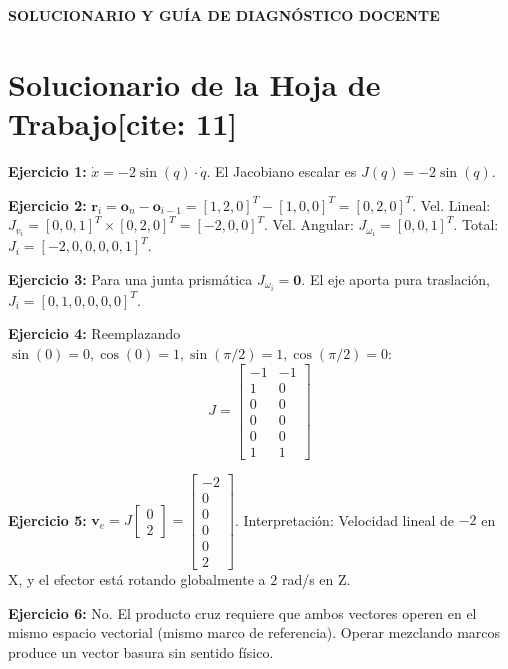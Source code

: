 \documentclass[11pt, a4paper]{article}
\begin{document}
\begin{center}
    \Large\textbf{\textcolor{red!80!black}{SOLUCIONARIO Y GUÍA DE DIAGNÓSTICO DOCENTE}}\\[0.2cm]
\end{center}

\section*{Solucionario de la Hoja de Trabajo[cite: 11]}

\textbf{Ejercicio 1:} $\dot{x} = -2\sin(q) \cdot \dot{q}$. El Jacobiano escalar es $J(q) = -2\sin(q)$.

\textbf{Ejercicio 2:}
$\mathbf{r}_i = \mathbf{o}_n - \mathbf{o}_{i-1} = [1,2,0]^T - [1,0,0]^T = [0,2,0]^T$.
Vel. Lineal: $J_{v_i} = [0,0,1]^T \times [0,2,0]^T = [-2,0,0]^T$.
Vel. Angular: $J_{\omega_i} = [0,0,1]^T$.
Total: $J_i = [-2, 0, 0, 0, 0, 1]^T$.

\textbf{Ejercicio 3:} Para una junta prismática $J_{\omega_i} = \mathbf{0}$. El eje aporta pura traslación, $J_i = [0, 1, 0, 0, 0, 0]^T$.

\textbf{Ejercicio 4:} Reemplazando $\sin(0)=0, \cos(0)=1, \sin(\pi/2)=1, \cos(\pi/2)=0$:
\begin{equation*}
    J = \begin{bmatrix} -1 & -1 \\ 1 & 0 \\ 0 & 0 \\ 0 & 0 \\ 0 & 0 \\ 1 & 1 \end{bmatrix}
\end{equation*}

\textbf{Ejercicio 5:}
$\mathbf{v}_e = J \begin{bmatrix} 0 \\ 2 \end{bmatrix} = \begin{bmatrix} -2 \\ 0 \\ 0 \\ 0 \\ 0 \\ 2 \end{bmatrix}$. 
Interpretación: Velocidad lineal de $-2$ en X, y el efector está rotando globalmente a $2$ rad/s en Z.

\textbf{Ejercicio 6:} No. El producto cruz requiere que ambos vectores operen en el mismo espacio vectorial (mismo marco de referencia). Operar mezclando marcos produce un vector basura sin sentido físico.
\end{document}
